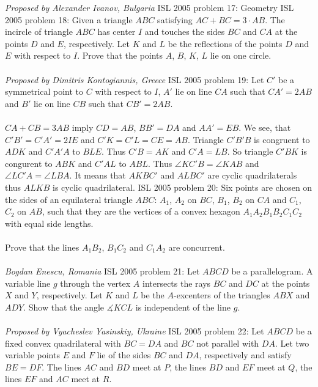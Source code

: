 \textit{Proposed by Alexander Ivanov, Bulgaria} 
ISL 2005 problem 17:  Geometry 
ISL 2005 problem 18:  Given a triangle $ABC$ satisfying $AC+BC=3\cdot AB$. The incircle of triangle $ABC$ has center $I$ and touches the sides $BC$ and $CA$ at the points $D$ and $E$, respectively. Let $K$ and $L$ be the reflections of the points $D$ and $E$ with respect to $I$. Prove that the points $A$, $B$, $K$, $L$ lie on one circle. \\\\
\textit{Proposed by Dimitris Kontogiannis, Greece} 
ISL 2005 problem 19:  Let $C'$ be a symmetrical point to $C$ with respect to $I$, $A'$ lie on line $CA$ such that $CA' = 2AB$ and $B'$ lie on line $CB$ such that $CB' = 2AB$. \\\\
$CA + CB = 3AB$ imply $CD = AB$, $BB' = DA$ and $AA' = EB$. We see, that $C'B' = C'A' = 2IE$ and $C'K = C'L = CE = AB$. Triangle $C'B'B$ is congruent to $ADK$ and $C'A'A$ to $BLE$. Thus $C'B = AK$ and $C'A = LB$. So triangle $C'BK$ is congurent to $ABK$ and $C'AL$ to $ABL$. Thus $\angle KC'B = \angle KAB$ and $\angle LC'A = \angle LBA$. It means that $AKBC'$ and $ALBC'$ are cyclic quadrilaterals thus $ALKB$ is cyclic quadrilateral. 
ISL 2005 problem 20:  Six points are  chosen on the sides of an equilateral triangle $ABC$: $A_1$, $A_2$ on $BC$, $B_1$, $B_2$ on $CA$ and $C_1$, $C_2$ on $AB$, such that they are the vertices of a convex hexagon $A_1A_2B_1B_2C_1C_2$ with equal side lengths. \\\\
Prove that the lines $A_1B_2$, $B_1C_2$ and $C_1A_2$ are concurrent. \\\\
\textit{Bogdan Enescu, Romania} 
ISL 2005 problem 21:  Let $ABCD$ be a parallelogram. A variable line $g$ through the vertex $A$ intersects the rays $BC$ and $DC$ at the points $X$ and $Y$, respectively. Let $K$ and $L$ be the $A$-excenters of the triangles $ABX$ and $ADY$. Show that the angle $\measuredangle KCL$ is independent of the line $g$. \\\\
\textit{Proposed by Vyacheslev Yasinskiy, Ukraine} 
ISL 2005 problem 22:  Let $ABCD$ be a fixed convex quadrilateral with $BC=DA$ and $BC$ not parallel with $DA$. Let two variable points $E$ and $F$ lie of the sides $BC$ and $DA$, respectively and satisfy $BE=DF$. The lines $AC$ and $BD$ meet at $P$, the lines $BD$ and $EF$ meet at $Q$, the lines $EF$ and $AC$ meet at $R$. \\\\

